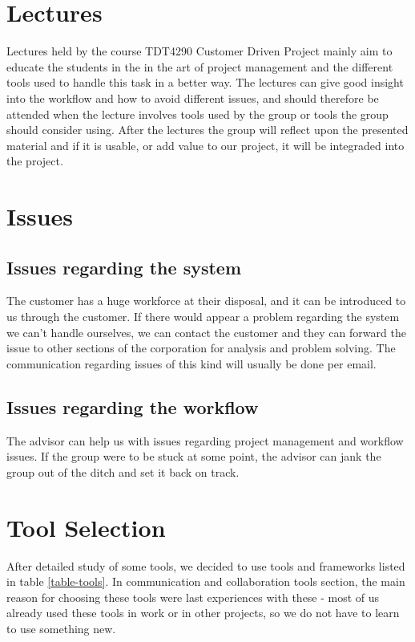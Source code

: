 \section{Lectures}
Lectures held by the course TDT4290 Customer Driven Project mainly aim to educate the students in the in the art of project management and the different tools used to handle this task in a better way. The lectures can give good insight into the workflow and how to avoid different issues, and should therefore be attended when the lecture involves tools used by the group or tools the group should consider using. After the lectures the group will reflect upon the presented material and if it is usable, or add value to our project, it will be integraded into the project.

\section{Issues}
\subsection{Issues regarding  the system}
The customer has a huge workforce at their disposal, and it can be introduced to us through the customer. If there would appear a problem regarding the system we can’t handle ourselves, we can contact the customer and they can forward the issue to other sections of the corporation for analysis and problem solving. The communication regarding issues of this kind will usually be done per email. 

\subsection{Issues regarding the workflow}
The advisor can help us with issues regarding project management and workflow issues. If the group were to be stuck at some point, the advisor can jank the group out of the ditch and set it back on track. 

\section{Tool Selection}
After detailed study of some tools, we decided to use tools and frameworks listed in table \ref{table-tools}. In communication and collaboration tools section, the main reason for choosing these tools were last experiences with these - most of us already used these tools in work or in other projects, so we do not have to learn to use something new. 

